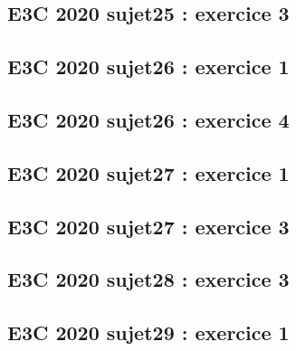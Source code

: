\documentclass[lang=fr,edition=teacher,layout=sheet]{mxbook}
\begin{document}
\begingroup\endgroup
\par\bigskip
{}\subsection*{E3C 2020 sujet25 : exercice 3}
\begingroup\endgroup
\par\bigskip
{}\subsection*{E3C 2020 sujet26 : exercice 1}
\begingroup\endgroup
\par\bigskip
{}\subsection*{E3C 2020 sujet26 : exercice 4}
\begingroup\endgroup
\par\bigskip
{}\subsection*{E3C 2020 sujet27 : exercice 1}
\begingroup\endgroup
\par\bigskip
{}\subsection*{E3C 2020 sujet27 : exercice 3}
\begingroup\endgroup
\par\bigskip
{}\subsection*{E3C 2020 sujet28 : exercice 3}
\begingroup\endgroup
\par\bigskip
{}\subsection*{E3C 2020 sujet29 : exercice 1}
\begingroup\endgroup
\end{document}
